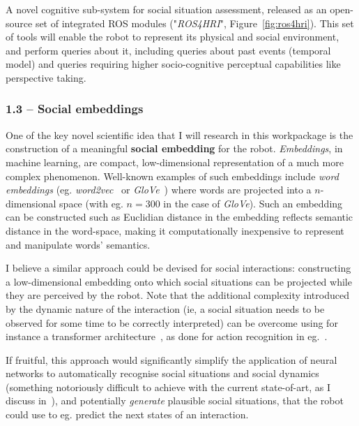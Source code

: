 \begin{outcome}{1.2}
A novel cognitive sub-system for social
    situation assessment, released as an open-source set of integrated ROS
    modules ("\emph{ROS4HRI}", Figure~\ref{fig:ros4hri}). This set of tools will enable the robot to
    represent its physical and social environment, and perform queries about it,
    including queries about past events (temporal model) and queries requiring
    higher socio-cognitive perceptual capabilities like perspective taking.
\end{outcome}


\subsubsection{1.3 -- Social embeddings}

One of the key novel scientific idea that I will research in this workpackage is
the construction of a meaningful \textbf{social embedding} for the robot.
\emph{Embeddings}, in machine learning, are compact, low-dimensional
representation of a much more complex phenomenon. Well-known examples of such embeddings
include \emph{word embeddings} (eg.
\emph{word2vec}~\autocite{mikolov2013distributed} or \emph{GloVe}~\autocite{pennington2014glove}) where
words are projected into a $n$-dimensional space (with eg. $n = 300$ in the case
of \emph{GloVe}). Such an embedding can be constructed such as Euclidian
distance in the embedding reflects semantic distance in the word-space, making
it computationally inexpensive to represent and manipulate words' semantics.

I believe a similar approach could be devised for social interactions:
constructing a low-dimensional embedding onto which social situations can be
projected while they are perceived by the robot.
Note that the additional complexity introduced by the dynamic nature of the interaction
(ie, a social situation needs to be observed for some time to be correctly
interpreted) can be overcome using for instance a transformer
architecture~\autocite{vaswani2017attention}, as done for action recognition
in eg.~\textcite{girdhar2019video}.


If fruitful, this approach would significantly simplify the application of
neural networks to automatically recognise social situations and social dynamics
(something notoriously difficult to achieve with the current
state-of-art, as I discuss in~\textcite{bartlett2019what}), and potentially \emph{generate}
plausible social situations, that the robot could use to eg. predict the next
states of an interaction.

